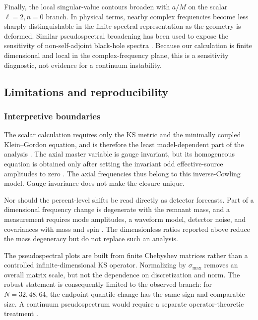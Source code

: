 \documentclass[12pt,a4paper]{article}
\begin{document}
Finally, the local singular-value contours broaden with \(a/M\) on the scalar
\(\ell=2,n=0\) branch.  In physical terms, nearby complex frequencies become
less sharply distinguishable in the finite spectral representation as the
geometry is deformed.  Similar pseudospectral broadening has been used to
expose the sensitivity of non-self-adjoint black-hole spectra
\cite{Jaramillo2021,Cao2024}.  Because our calculation is finite dimensional
and local in the complex-frequency plane, this is a sensitivity diagnostic,
not evidence for a continuum instability.

\subsection{Limitations and reproducibility}

\subsubsection{Interpretive boundaries}

The scalar calculation requires only the KS metric and the minimally coupled
Klein--Gordon equation, and is therefore the least model-dependent part of the
analysis \cite{Kazakov1994,Konoplya2020}. The axial master variable is gauge
invariant, but its homogeneous equation is obtained only after setting the
invariant odd effective-source amplitudes to zero
\cite{Gerlach1979,Gundlach1999,Karlovini2002}. The axial frequencies thus belong
to this inverse-Cowling model. Gauge invariance does not make the closure unique.

Nor should the percent-level shifts be read directly as detector forecasts.
Part of a dimensional frequency change is degenerate with the remnant mass,
and a measurement requires mode amplitudes, a waveform model, detector noise,
and covariances with mass and spin \cite{Berti2006,Berti2009,Isi2019}. The
dimensionless ratios reported above reduce the mass degeneracy but do not
replace such an analysis.

The pseudospectral plots are built from finite Chebyshev matrices rather than a
controlled infinite-dimensional KS operator. Normalizing by
\(\sigma_{\max}\) removes an overall matrix scale, but not the dependence on
discretization and norm. The robust statement is consequently limited to the
observed branch: for \(N=32,48,64\), the endpoint quantile change has the same
sign and comparable size. A continuum
pseudospectrum would require a separate operator-theoretic treatment
\cite{Jaramillo2021,Cao2024}.
\end{document}
